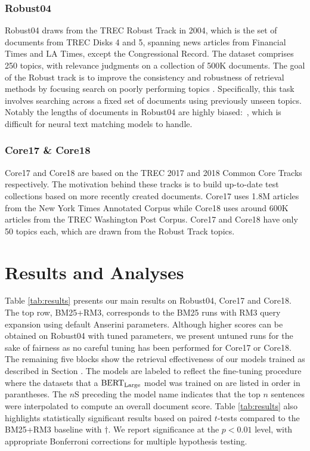 \subsubsection{Robust04}

Robust04 draws from the TREC Robust Track in 2004, which is the set of documents from TREC Disks 4 and 5, spanning news articles from Financial Times and LA Times, except the Congressional Record.
The dataset comprises 250 topics, with relevance judgments on a collection of 500K documents.
The goal of the Robust track is to improve the consistency and robustness of retrieval methods by focusing search on poorly performing topics .
Specifically, this task involves searching across a fixed set of documents using previously unseen topics.
Notably the lengths of documents in Robust04 are highly biased:\ , which is difficult for neural text matching models to handle.

\subsubsection{Core17 \& Core18}

Core17 and Core18 are based on the TREC 2017 and 2018 Common Core Tracks respectively.
The motivation behind these tracks is to build up-to-date test collections based on more recently created documents.
Core17 uses 1.8M articles from the New York Times Annotated Corpus
while Core18 uses around 600K articles from the TREC Washington Post Corpus.
Core17 and Core18 have only 50 topics each, which are drawn from the Robust Track topics.

\section{Results and Analyses}

Table \ref{tab:results} presents our main results on Robust04, Core17 and Core18.
The top row, BM25+RM3, corresponds to the BM25 runs with RM3 query expansion using default Anserini parameters.
Although higher scores can be obtained on Robust04 with tuned parameters, we present untuned runs for the sake of fairness as no careful tuning has been performed for Core17 or Core18.
The remaining five blocks show the retrieval effectiveness of our models trained as described in Section .
The models are labeled to reflect the fine-tuning procedure where the datasets that a $ \textrm{BERT}_{\textrm{\scriptsize Large}} $ model was trained on are listed in order in parantheses.
The $ n $S preceding the model name indicates that the top $ n$ sentences were interpolated to compute an overall document score.
Table \ref{tab:results} also highlights statistically significant results based on paired $ t $-tests compared to the BM25+RM3 baseline with $ {\dagger} $.
We report significance at the $ p<0.0 1$ level, with appropriate Bonferroni corrections for multiple hypothesis testing.

